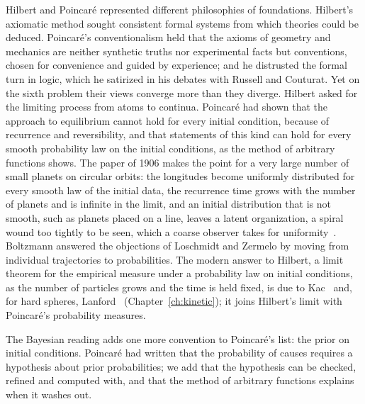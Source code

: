 Hilbert and Poincar\'e represented different philosophies of foundations. Hilbert's axiomatic method sought consistent formal systems from which theories could be deduced. Poincar\'e's conventionalism held that the axioms of geometry and mechanics are neither synthetic truths nor experimental facts but conventions, chosen for convenience and guided by experience; and he distrusted the formal turn in logic, which he satirized in his debates with Russell and Couturat. Yet on the sixth problem their views converge more than they diverge. Hilbert asked for the limiting process from atoms to continua. Poincar\'e had shown that the approach to equilibrium cannot hold for every initial condition, because of recurrence and reversibility, and that statements of this kind can hold for every smooth probability law on the initial conditions, as the method of arbitrary functions shows. The paper of 1906 makes the point for a very large number of small planets on circular orbits: the longitudes become uniformly distributed for every smooth law of the initial data, the recurrence time grows with the number of planets and is infinite in the limit, and an initial distribution that is not smooth, such as planets placed on a line, leaves a latent organization, a spiral wound too tightly to be seen, which a coarse observer takes for uniformity~\cite{poincare1906}. Boltzmann answered the objections of Loschmidt and Zermelo by moving from individual trajectories to probabilities. The modern answer to Hilbert, a limit theorem for the empirical measure under a probability law on initial conditions, as the number of particles grows and the time is held fixed, is due to Kac~\cite{kac1956} and, for hard spheres, Lanford~\cite{lanford1975} (Chapter~\ref{ch:kinetic}); it joins Hilbert's limit with Poincar\'e's probability measures.

The Bayesian reading adds one more convention to Poincar\'e's list: the prior on initial conditions. Poincar\'e had written that the probability of causes requires a hypothesis about prior probabilities; we add that the hypothesis can be checked, refined and computed with, and that the method of arbitrary functions explains when it washes out.

